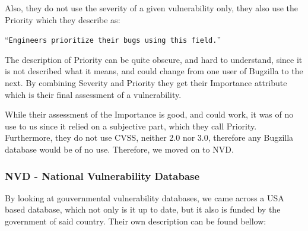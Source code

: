 Also, they do not use the severity of a given vulnerability only, they also use the Priority which they describe as:

\enquote{\texttt{Engineers prioritize their bugs using this field.}}\parencite{bugzilla}

The description of Priority can be quite obscure, and hard to understand, since it is not described what it means, and could change from one user of Bugzilla to the next. By combining Severity and Priority they get their Importance attribute which is their final assessment of a vulnerability.

While their assessment of the Importance is good, and could work, it was of no use to us since it relied on a subjective part, which they call Priority. Furthermore, they do not use CVSS, neither 2.0 nor 3.0, therefore any Bugzilla database would be of no use. Therefore, we moved on to NVD.

\subsubsection{NVD - National Vulnerability Database}

By looking at gouvernmental vulnerability databases, we came across a USA based database, which not only is it up to date, but it also is funded by the government of said country. Their own description can be found bellow:\\

